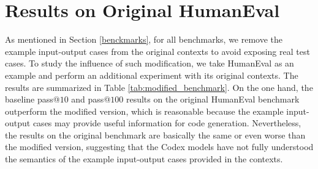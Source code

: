 \section{Results on Original HumanEval}
\label{sec:appendix_origial_humaneval}
\begin{table}[t]
    \centering
    \caption{Pass@$k$ ($\%$) on the original HumanEval benchmark with Codex models. The numbers in {\textcolor{orange}{orange}} indicate the absolute improvements of pass@$k$ on the original benchmark over our modified benchmark in Table \ref{tab:main}. 
}
    \label{tab:modified_benchmark}
\end{table}
As mentioned in Section \ref{benckmarks}, for all benchmarks, we remove the example input-output cases from the original contexts to avoid exposing real test cases. To study the influence of such modification, we take HumanEval as an example and perform an additional experiment with its original contexts. The results are summarized in Table \ref{tab:modified_benchmark}.
On the one hand, the baseline pass@$10$ and pass@$100$ results on the original HumanEval benchmark outperform the modified version, which is reasonable because the example input-output cases may provide useful information for code generation. Nevertheless, the  results on the original benchmark are basically the same or even worse than the modified version, suggesting that the Codex models have not fully understood the semantics of the example input-output cases provided in the contexts. 
